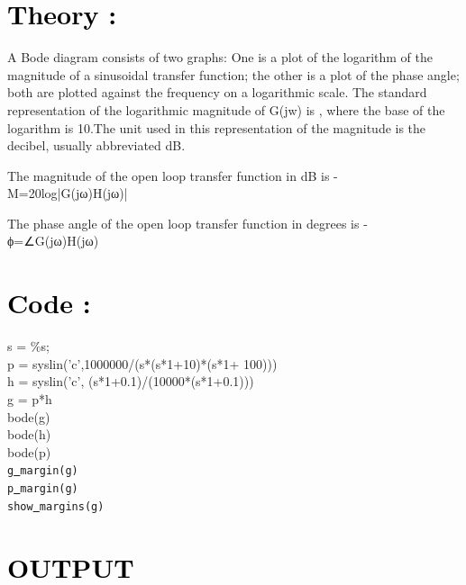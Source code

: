 \documentclass[12pt]{article}
\begin{document}
\section*{\textcolor{black}{Theory :}}
A Bode diagram consists of two graphs: One is a plot of the logarithm of the magnitude of a sinusoidal transfer function; the other is a plot of the phase angle; both are plotted against the frequency on a logarithmic scale. The standard representation of the logarithmic magnitude of G(jw) is , where the base of the logarithm is 10.The unit used in this representation of the magnitude is the decibel, usually abbreviated dB.

The magnitude of the open loop transfer function in dB is -
  M=20log|G(jω)H(jω)|

The phase angle of the open loop transfer function in degrees is -
  ϕ=∠G(jω)H(jω)

 \par

\section*{\textcolor{black}{Code :}}

s = \%s;\\
p = syslin('c',1000000/(s*(s*1+10)*(s*1+ 100)))\\
h = syslin('c', (s*1+0.1)/(10000*(s*1+0.1)))\\
g = p*h \\        
bode(g)\\
bode(h)\\
bode(p)\\
\texttt{g\underline{{ }}margin(g)}\\
\texttt{p\underline{{ }}margin(g)}\\
\texttt{show\underline{{ }}margins(g)}\\


  \par 

\section*{\textcolor{black}{OUTPUT}}
\end{document}
